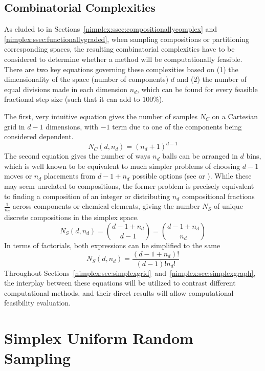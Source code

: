 \subsection{Combinatorial Complexities} \label{nimplex:ssec:combinatorialcomplexities}

As eluded to in Sections~\ref{nimplex:ssec:compositionallycomplex} and \ref{nimplex:ssec:functionallygraded}, when sampling compositions or partitioning corresponding spaces, the resulting combinatorial complexities have to be considered to determine whether a method will be computationally feasible. There are two key equations governing these complexities based on (1) the dimensionality of the space (number of components) $d$ and (2) the number of equal divisions made in each dimension $n_d$, which can be found for every feasible fractional step size (such that it can add to $100\%$). 

The first, very intuitive equation gives the number of samples $N_C$ on a Cartesian grid in $d-1$ dimensions, with $-1$ term due to one of the components being considered dependent.
\begin{equation}
    N_C(d, n_d) = (n_d+1)^{d-1}
    \label{nimplex:eq:nc}
\end{equation}
The second equation gives the number of ways $n_d$ balls can be arranged in $d$ bins, which is well known to be equivalent to much simpler problems of choosing $d-1$ moves or $n_d$ placements from $d-1+n_d$ possible options (see \cite{Nijenhuis1978CombinatorialCalculators} or \cite{Chasalow1995AlgorithmPoints}). While these may seem unrelated to compositions, the former problem is precisely equivalent to finding a composition of an integer or distributing $n_d$ compositional fractions $\frac{1}{n_d}$ across components or chemical elements, giving the number $N_S$ of unique discrete compositions in the simplex space.
\begin{equation}
    N_S(d, n_d) = \binom{d-1+n_d}{d-1} = \binom{d-1+n_d}{n_d}
    \label{nimplex:eq:ns1}
\end{equation}
In terms of factorials, both expressions can be simplified to the same
\[N_S(d, n_d) = \frac{(d - 1 + n_d)!}{(d-1)!n_d!}\]
Throughout Sections~\ref{nimplex:sec:simplexgrid}~and~\ref{nimplex:sec:simplexgraph}, the interplay between these equations will be utilized to contrast different computational methods, and their direct results will allow computational feasibility evaluation. 


\section{Simplex Uniform Random Sampling} \label{nimplex:sec:randomuniformsampling}


